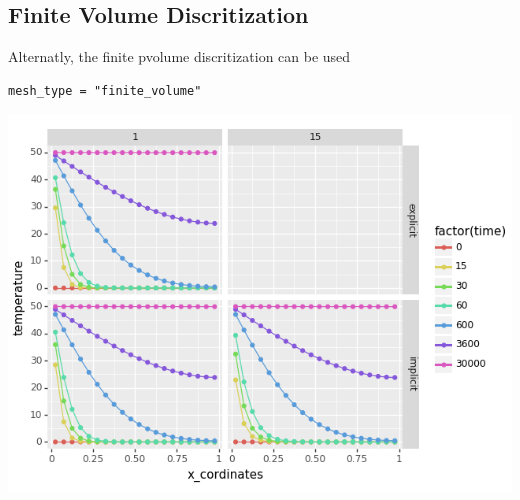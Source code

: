 \documentclass[letterpaper, 11pt]{article}
\begin{document}
\subsection{Finite Volume Discritization}
\label{sec:orgc4eeb34}

Alternatly, the finite pvolume discritization can be used
\begin{verbatim}
mesh_type = "finite_volume"
\end{verbatim}

\begin{center}
\includegraphics[width=.9\linewidth]{finite_volume.png}
\end{center}
\end{document}
